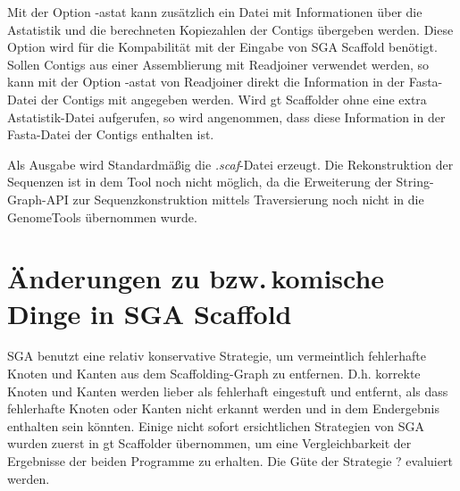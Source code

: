 \documentclass[a4paper,10pt,parskip]{scrartcl}
\begin{document}
Mit der Option -astat kann zusätzlich ein Datei mit Informationen über
die Astatistik und die berechneten Kopiezahlen der Contigs übergeben
werden. Diese Option wird für die Kompabilität mit der Eingabe von SGA
Scaffold benötigt. Sollen Contigs aus einer Assemblierung mit
Readjoiner verwendet werden, so kann mit der Option -astat von
Readjoiner direkt die Information in der Fasta-Datei der Contigs mit
angegeben werden. Wird gt Scaffolder ohne eine extra Astatistik-Datei
aufgerufen, so wird angenommen, dass diese Information in der
Fasta-Datei der Contigs enthalten ist.

Als Ausgabe wird Standardmäßig die \textit{.scaf}-Datei
erzeugt. Die Rekonstruktion der Sequenzen ist in dem Tool noch nicht
möglich, da die Erweiterung der String-Graph-API zur
Sequenzkonstruktion mittels Traversierung noch nicht in die
GenomeTools übernommen wurde.

\section{Änderungen zu bzw.\,komische Dinge in SGA Scaffold}

SGA benutzt eine relativ konservative Strategie, um vermeintlich
fehlerhafte Knoten und Kanten aus dem Scaffolding-Graph zu
entfernen. D.h. korrekte Knoten und Kanten werden lieber als
fehlerhaft eingestuft und entfernt, als dass fehlerhafte Knoten oder
Kanten nicht erkannt werden und in dem Endergebnis enthalten sein
könnten. Einige nicht sofort ersichtlichen Strategien von SGA wurden
zuerst in gt Scaffolder übernommen, um eine Vergleichbarkeit der
Ergebnisse der beiden Programme zu erhalten. Die Güte der Strategie
? evaluiert werden.
\end{document}

